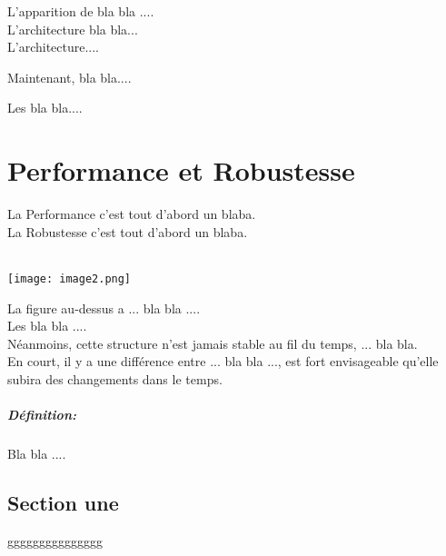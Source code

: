 \documentclass[12pt, a4paper, openany]{report}
\begin{document}
 L'apparition de bla bla ....\\
 
 L'architecture bla bla...\\
 
 L'architecture....
 
 Maintenant, bla bla....
 
 Les bla bla....
 



\chapter{Performance et Robustesse}
 La Performance c’est tout d’abord un blaba.\\
 
 La Robustesse c’est tout d’abord un blaba.\\ \\
 \begin{center}
   \texttt{[image: image2.png]}
   \label{fig1}
 \end{center}
 
 La figure au-dessus a ... bla bla ....\\
 
 Les bla bla ....\\
 
 Néanmoins, cette structure n’est jamais stable au fil du temps, ... bla bla.\\
  
 En court, il y a une différence entre ... bla bla ..., est fort envisageable qu’elle subira des changements dans le temps.
 
 \paragraph{Définition:}
  Bla bla ....

 \section{Section une}
  ggggggggggggggg
\end{document}
